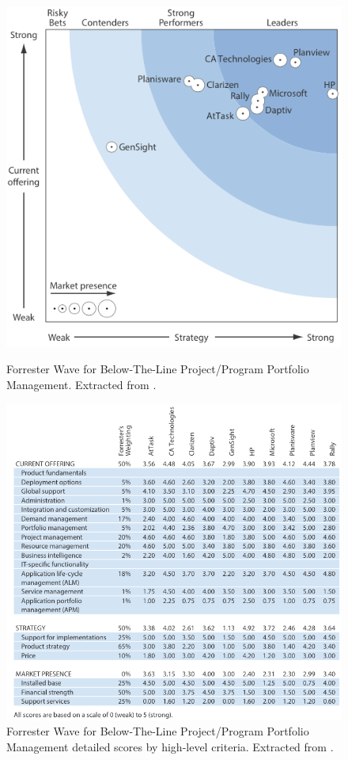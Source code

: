 \begin{figure}[h!]
\begin{minipage}[h!]{0.40\linewidth}
\centering
\includegraphics[width=\textwidth]{img/BelowLineWave.png}
\caption{Forrester Wave for Below-The-Line Project/Program Portfolio Management. Extracted from \cite{forresterWavePPM}.}
\label{fig:figure1}
\end{minipage}
\hspace{0.5cm}
\begin{minipage}[h!]{0.60\linewidth}
\centering
\includegraphics[width=\textwidth]{img/BelowLineScores.png}
\caption{Forrester Wave for Below-The-Line Project/Program Portfolio Management detailed scores by high-level criteria. Extracted from \cite{forresterWavePPM}.}
\label{fig:figure2}
\end{minipage}
\end{figure}

